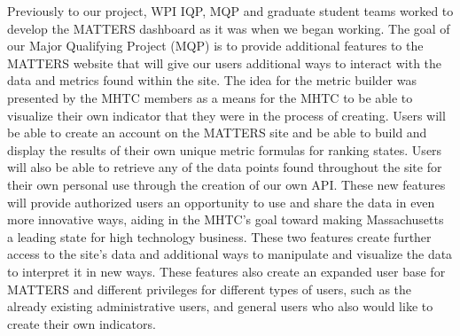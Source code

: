 	Previously to our project, WPI IQP, MQP and graduate student teams worked to 
	develop the MATTERS dashboard as it was when we began working. The goal of our 
	Major Qualifying Project (MQP) is to provide additional features to the MATTERS 
	website that will give our users additional ways to interact with the data and 
	metrics found within the site. The idea for the metric builder was presented by 
	the MHTC members as a means for the MHTC to be able to visualize their own 
	indicator that they were in the process of creating. Users will be able to 
	create an account on the MATTERS site and be able to build and display the 
	results of their own unique metric formulas for ranking states. Users will 
	also be able to retrieve any of the data points found throughout the site 
	for their own personal use through the creation of our own API. These new 
	features will provide authorized users an opportunity to use and share the 
	data in even more innovative ways, aiding in the MHTC’s goal toward making 
	Massachusetts a leading state for high technology business. These two features 
	create further access to the site’s data and additional ways to manipulate and 
	visualize the data to interpret it in new ways. These features also create an 
	expanded user base for MATTERS and different privileges for different types of 
	users, such as the already existing administrative users, and general users who 
	also would like to create their own indicators.